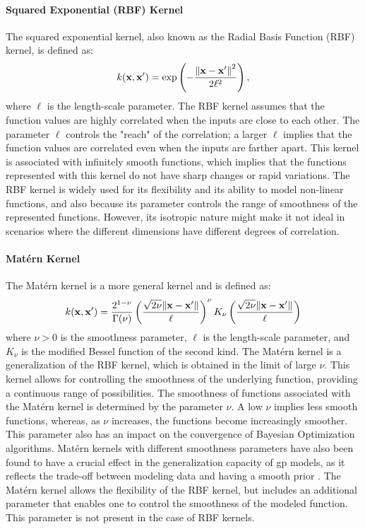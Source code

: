 \paragraph{Squared Exponential (RBF) Kernel}

The squared exponential kernel, also known as the Radial Basis Function (RBF) kernel, is defined as:
\[ k(\mathbf{x}, \mathbf{x}^\prime) = \exp\left(-\frac{\norm{\mathbf{x} - \mathbf{x}^\prime}^2}{2\ell^2}\right),\]
where $\ell$ is the length-scale parameter. The RBF kernel assumes that the function values are highly correlated when the inputs are close to each other. The parameter $\ell$ controls the "reach" of the correlation; a larger $\ell$ implies that the function values are correlated even when the inputs are farther apart. This kernel is associated with infinitely smooth functions, which implies that the functions represented with this kernel do not have sharp changes or rapid variations. The RBF kernel is widely used for its flexibility and its ability to model non-linear functions, and also because its parameter controls the range of smoothness of the represented functions. However, its isotropic nature might make it not ideal in scenarios where the different dimensions have different degrees of correlation.

\paragraph{Mat\'ern Kernel}

The Mat\'ern kernel is a more general kernel and is defined as:
\[ k(\mathbf{x}, \mathbf{x}^\prime) = \frac{2^{1-\nu}}{\Gamma(\nu)}\left(\frac{\sqrt{2\nu}\norm{\mathbf{x}-\mathbf{x}^\prime}}{\ell}\right)^\nu K_\nu\left(\frac{\sqrt{2\nu}\norm{\mathbf{x}-\mathbf{x}^\prime}}{\ell}\right)\]
where $\nu > 0$ is the smoothness parameter, $\ell$ is the length-scale parameter, and $K_\nu$ is the modified Bessel function of the second kind. The Mat\'ern kernel is a generalization of the RBF kernel, which is obtained in the limit of large $\nu$.  This kernel allows for controlling the smoothness of the underlying function, providing a continuous range of possibilities. The smoothness of functions associated with the Mat\'ern kernel is determined by the parameter $\nu$. A low $\nu$ implies less smooth functions, whereas, as $\nu$ increases, the functions become increasingly smoother. This parameter also has an impact on the convergence of Bayesian Optimization algorithms. Mat\'ern kernels with different smoothness parameters have also been found to have a crucial effect in the generalization capacity of \ac{gp} models, as it reflects the trade-off between modeling data and having a smooth prior \citep{rasmussen2006gaussian}. The Mat\'ern kernel allows the flexibility of the RBF kernel, but includes an additional parameter that enables one to control the smoothness of the modeled function. This parameter is not present in the case of RBF kernels.

